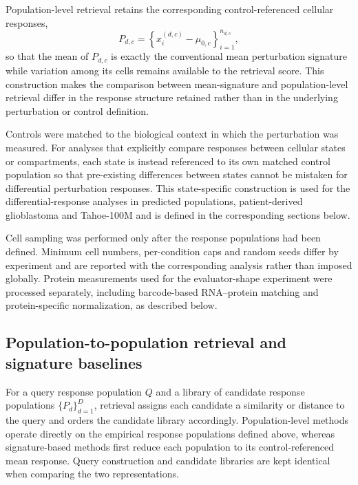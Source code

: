 \documentclass[11pt,letterpaper]{article}
\begin{document}
Population-level retrieval retains the corresponding control-referenced cellular responses,
$$
P_{d,c}
=
\left\{
x^{(d,c)}_i-\mu_{0,c}
\right\}_{i=1}^{n_{d,c}},
$$
so that the mean of $P_{d,c}$ is exactly the conventional mean perturbation signature while variation among its cells remains available to the retrieval score. This construction makes the comparison between mean-signature and population-level retrieval differ in the response structure retained rather than in the underlying perturbation or control definition.

Controls were matched to the biological context in which the perturbation was measured. For analyses that explicitly compare responses between cellular states or compartments, each state is instead referenced to its own matched control population so that pre-existing differences between states cannot be mistaken for differential perturbation responses. This state-specific construction is used for the differential-response analyses in predicted populations, patient-derived glioblastoma and Tahoe-100M and is defined in the corresponding sections below.

Cell sampling was performed only after the response populations had been defined. Minimum cell numbers, per-condition caps and random seeds differ by experiment and are reported with the corresponding analysis rather than imposed globally. Protein measurements used for the evaluator-shape experiment were processed separately, including barcode-based RNA--protein matching and protein-specific normalization, as described below.



\subsection*{Population-to-population retrieval and signature baselines}

For a query response population $Q$ and a library of candidate response populations
$\{P_d\}_{d=1}^{D}$, retrieval assigns each candidate a similarity or distance to the
query and orders the candidate library accordingly. Population-level methods operate
directly on the empirical response populations defined above, whereas signature-based
methods first reduce each population to its control-referenced mean response. Query
construction and candidate libraries are kept identical when comparing the two
representations.
\end{document}
